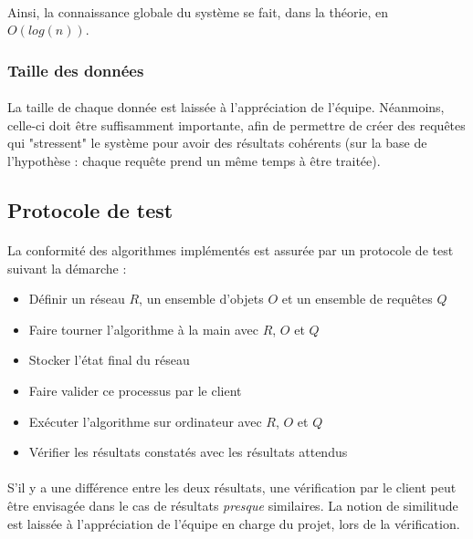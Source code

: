 \documentclass[12pt]{article}
\begin{document}
\paragraph{}Ainsi, la connaissance globale du système se fait, dans la théorie, en $O(log(n))$.


\subsubsection{Taille des données}

\paragraph{} La taille de chaque donnée est laissée à l'appréciation de l'équipe. 
Néanmoins, celle-ci doit être suffisamment importante, afin de permettre de créer des requêtes qui "stressent" le système pour avoir des résultats cohérents (sur la base de l'hypothèse : chaque requête prend un même temps à être traitée).


\subsection{Protocole de test}

\paragraph{} La conformité des algorithmes implémentés est assurée par un protocole de test suivant la démarche :

\begin{itemize}
	\item Définir un réseau $R$, un ensemble d'objets $O$ et un ensemble de requêtes $Q$
	\item Faire tourner l'algorithme à la main avec $R$, $O$ et $Q$
	\item Stocker l'état final du réseau
	\item Faire valider ce processus par le client
	\item Exécuter l'algorithme sur ordinateur avec $R$, $O$ et $Q$
	\item Vérifier les résultats constatés avec les résultats attendus
\end{itemize}
	
\paragraph{} S'il y a une différence entre les deux résultats, une vérification par le client peut être envisagée dans le cas de résultats \textit{presque} similaires. 
La notion de similitude est laissée à l'appréciation de l'équipe en charge du projet, lors de la vérification.
\end{document}
